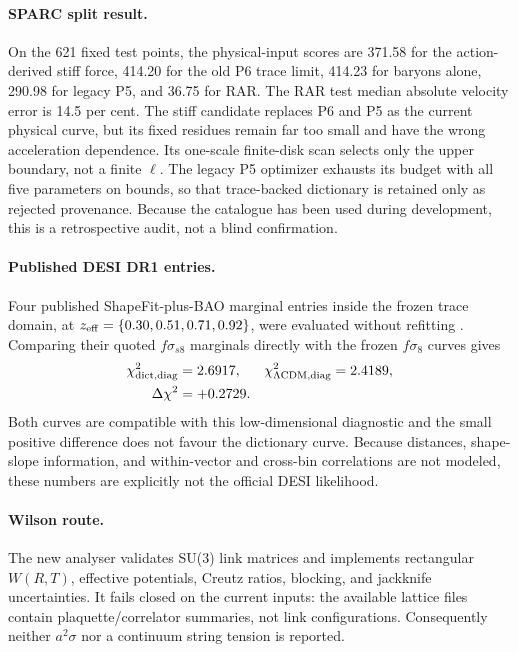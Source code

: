 \documentclass[10pt]{article}
\newcommand{\LCDM}{\Lambda\mathrm{CDM}}
\begin{document}
\paragraph{SPARC split result.}
On the 621 fixed test points, the physical-input scores are 371.58 for the
action-derived stiff force, 414.20 for the old P6 trace limit, 414.23 for
baryons alone, 290.98 for legacy P5, and 36.75 for RAR.  The RAR test median
absolute velocity error is 14.5 per cent.  The stiff candidate replaces P6 and
P5 as the current physical curve, but its fixed residues remain far too small
and have the wrong acceleration dependence.  Its one-scale finite-disk scan
selects only the upper boundary, not a finite $\ell$.  The legacy P5 optimizer
exhausts its budget with all five parameters on bounds, so that trace-backed
dictionary is retained only as rejected provenance.  Because
the catalogue has been used during development, this is a retrospective audit,
not a blind confirmation.

\paragraph{Published DESI DR1 entries.}
Four published ShapeFit-plus-BAO marginal entries inside the frozen trace
domain, at $z_{\rm eff}=\{0.30,0.51,0.71,0.92\}$, were evaluated without
refitting \citep{DESI2025}.  Comparing their quoted $f\sigma_{s8}$ marginals
directly with the frozen $f\sigma_8$ curves gives
\begin{equation}
 \begin{aligned}
  \chi^2_{\rm dict,diag}&=2.6917,&
  \chi^2_{\LCDM,\rm diag}&=2.4189,\\
  \Delta\chi^2&=+0.2729.&&
 \end{aligned}
\end{equation}
Both curves are compatible with this low-dimensional diagnostic and the small
positive difference does not favour the dictionary curve.  Because distances,
shape-slope information, and within-vector and cross-bin correlations are not
modeled, these numbers are explicitly not the official DESI likelihood.

\paragraph{Wilson route.}
The new analyser validates SU(3) link matrices and implements rectangular
$W(R,T)$, effective potentials, Creutz ratios, blocking, and jackknife
uncertainties.  It fails closed on the current inputs: the available lattice
files contain plaquette/correlator summaries, not link configurations.
Consequently neither $a^2\sigma$ nor a continuum string tension is reported.
\end{document}
